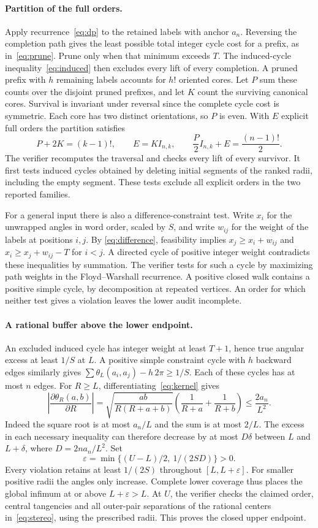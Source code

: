 \paragraph{Partition of the full orders.}
Apply recurrence~\eqref{eq:dp} to the retained labels with anchor $a_n$.
Reversing the completion path gives the least possible total integer
cycle cost for a prefix, as in~\eqref{eq:prune}. Prune only when that
minimum exceeds $T$. The induced-cycle inequality~\eqref{eq:induced}
then excludes every lift of every completion. A pruned prefix with $h$
remaining labels accounts for $h!$ oriented cores. Let $P$ sum these
counts over the disjoint pruned prefixes, and let $K$ count the surviving
canonical cores. Survival is invariant under reversal since the complete
cycle cost is symmetric. Each core has two distinct orientations, so $P$
is even. With $E$ explicit full orders the partition satisfies
\[
 P+2K=(k-1)!,\qquad E=K I_{n,k},\qquad
 \frac{P}{2}I_{n,k}+E=\frac{(n-1)!}{2}.
\]
The verifier recomputes the traversal and checks every lift of every
survivor. It first tests induced cycles obtained by deleting initial
segments of the ranked radii, including the empty segment. These tests
exclude all explicit orders in the two reported families.

For a general input there is also a difference-constraint test. Write
$x_i$ for the unwrapped angles in word order, scaled by $S$, and write
$w_{ij}$ for the weight of the labels at positions $i,j$. By
\eqref{eq:difference}, feasibility implies
$x_j\ge x_i+w_{ij}$ and $x_i\ge x_j+w_{ij}-T$ for $i<j$.
A directed cycle of positive integer weight contradicts these inequalities
by summation. The verifier tests for such a cycle by maximizing path
weights in the Floyd--Warshall recurrence. A positive closed walk contains
a positive simple cycle, by decomposition at repeated vertices. An order
for which neither test gives a violation leaves the lower audit incomplete.

\paragraph{A rational buffer above the lower endpoint.}
An excluded induced cycle has integer weight at least $T+1$, hence true
angular excess at least $1/S$ at $L$. A positive simple constraint cycle
with $h$ backward edges similarly gives
$\sum\theta_L(a_i,a_j)-h\,2\pi\ge1/S$. Each of these cycles has at most
$n$ edges. For $R\ge L$, differentiating~\eqref{eq:kernel} gives
\[
 \left|\frac{\partial\theta_R(a,b)}{\partial R}\right|
 =\sqrt{\frac{ab}{R(R+a+b)}}\left(\frac1{R+a}+\frac1{R+b}\right)
 \le\frac{2a_n}{L^2}.
\]
Indeed the square root is at most $a_n/L$ and the sum is at most $2/L$.
The excess in each necessary inequality can therefore decrease by at most
$D\delta$ between $L$ and $L+\delta$, where $D=2na_n/L^2$. Set
\[
 \varepsilon=\min\{(U-L)/2,\ 1/(2SD)\}>0.
\]
Every violation retains at least $1/(2S)$ throughout $[L,L+\varepsilon]$.
For smaller positive radii the angles only increase. Complete lower
coverage thus places the global infimum at or above $L+\varepsilon>L$.
At $U$, the verifier checks the claimed order, central tangencies and
all outer-pair separations of the rational centers in~\eqref{eq:stereo},
using the prescribed radii. This proves the closed upper endpoint.
